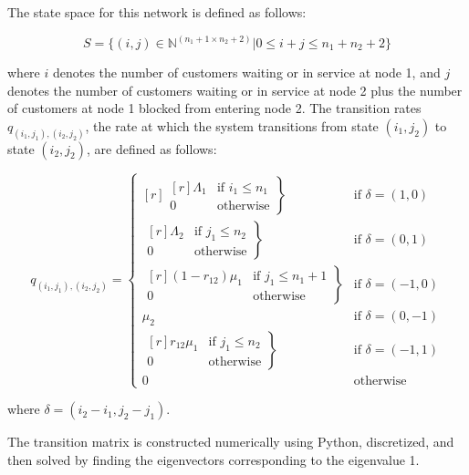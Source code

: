 \documentclass{article}
\begin{document}
The state space for this network is defined as follows:

\begin{equation*}
    S = \{(i,j)\in\mathbb{N}^{(n_1+1\times n_2+2)}| 0 \leq i + j \leq n_1 + n_2 + 2\}
\end{equation*}

where $i$ denotes the number of customers waiting or in service at node 1, and $j$ denotes the number of customers waiting or in service at node 2 plus the number of customers at node 1 blocked from entering node 2.
The transition rates $q_{(i_1, j_1),(i_2, j_2)}$, the rate at which the system transitions from state $(i_1, j_2)$ to state $(i_2, j_2)$, are defined as follows:

\begin{equation}
  q_{(i_1, j_1),(i_2, j_2)} = \left\{
  \begin{matrix*}[ r ]
    \left. \begin{matrix*}[ r ]
      \Lambda_1 & \text{if } i_1 \leq n_1 \\
      0 & \text{otherwise}
    \end{matrix*} \right\} & \text{if } \delta = (1, 0) \\
    \left. \begin{matrix*}[ r ]
      \Lambda_2 & \text{if } j_1 \leq n_2 \\
      0 & \text{otherwise}
    \end{matrix*} \right\} & \text{if } \delta = (0, 1) \\
    \left. \begin{matrix*}[ r ]
      (1 - r_{12})\mu_1 & \text{if } j_1 \leq n_1 + 1 \\
      0 & \text{otherwise}
    \end{matrix*} \right\} & \text{if } \delta = (-1, 0) \\
    \mu_2 & \text{if } \delta = (0, -1) \\
    \left. \begin{matrix*}[ r ]
      r_{12}\mu_1 & \text{if } j_1 \leq n_2 \\
      0 & \text{otherwise}
    \end{matrix*} \right\} & \text{if } \delta = (-1, 1) \\
    0 & \text{otherwise}
  \end{matrix*} \right.
\end{equation}

where $\delta = (i_2-i_1, j_2-j_1)$.

The transition matrix is constructed numerically using Python, discretized, and then solved by finding the eigenvectors corresponding to the eigenvalue 1.
\end{document}
